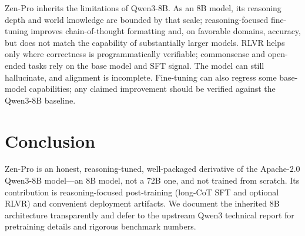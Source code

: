 \documentclass[11pt,a4paper]{article}
\begin{document}
Zen-Pro inherits the limitations of Qwen3-8B. As an 8B model, its reasoning depth and world
knowledge are bounded by that scale; reasoning-focused fine-tuning improves chain-of-thought
formatting and, on favorable domains, accuracy, but does not match the capability of substantially
larger models. RLVR helps only where correctness is programmatically verifiable; commonsense and
open-ended tasks rely on the base model and SFT signal. The model can still hallucinate, and
alignment is incomplete. Fine-tuning can also regress some base-model capabilities; any claimed
improvement should be verified against the Qwen3-8B baseline.

\section{Conclusion}

Zen-Pro is an honest, reasoning-tuned, well-packaged derivative of the Apache-2.0 Qwen3-8B model---an
8B model, not a 72B one, and not trained from scratch. Its contribution is reasoning-focused
post-training (long-CoT SFT and optional RLVR) and convenient deployment artifacts. We document the
inherited 8B architecture transparently and defer to the upstream Qwen3 technical report for
pretraining details and rigorous benchmark numbers.
\end{document}
